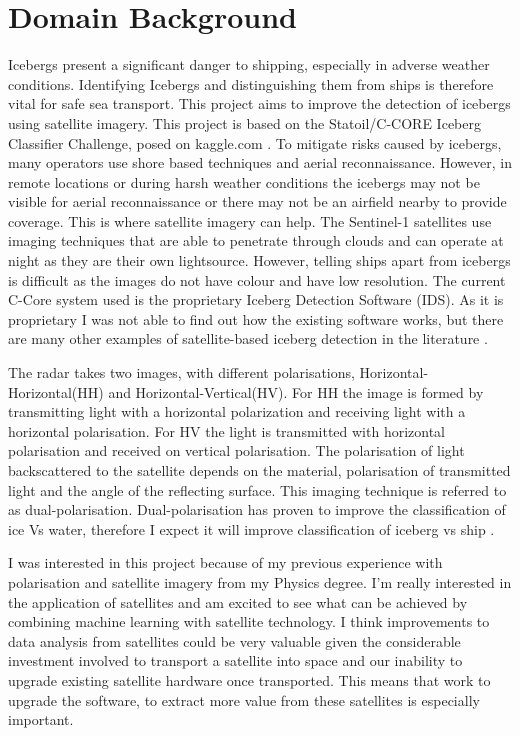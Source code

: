 \documentclass{article}
\begin{document}
\section{Domain Background}
Icebergs present a significant danger to shipping, especially in adverse weather conditions. Identifying Icebergs and distinguishing them from ships is therefore vital for safe sea transport. This project aims to improve the detection of icebergs using satellite imagery. This project is based on the Statoil/C-CORE Iceberg Classifier Challenge, posed on kaggle.com \cite{kaggle}. To mitigate risks caused by icebergs, many operators use shore based techniques and aerial reconnaissance. However, in remote locations or during harsh weather conditions the icebergs may not be visible for aerial reconnaissance or there may not be an airfield nearby to provide coverage. This is where satellite imagery can help. The Sentinel-1 satellites use imaging techniques that are able to penetrate through clouds and can operate at night as they are their own lightsource. However, telling ships apart from icebergs is difficult as the images do not have colour and have low resolution. The current C-Core system used is the proprietary Iceberg Detection Software (IDS). As it is proprietary I was not able to find out how the existing software works, but there are many other examples of satellite-based iceberg detection in the literature  \cite{c-core,bentes}. 

The radar takes two images, with different polarisations,  Horizontal-Horizontal(HH) and Horizontal-Vertical(HV). For HH the image is formed by transmitting light with a horizontal polarization and receiving light with a horizontal polarisation. For HV the light is transmitted with horizontal polarisation and received on vertical polarisation. The polarisation of light backscattered to the satellite depends on the material, polarisation of transmitted light and the angle of the reflecting surface. This imaging technique is referred to as dual-polarisation. Dual-polarisation has proven to improve the classification of ice Vs water, therefore I expect it will improve classification of iceberg vs ship \cite{radarsat-mode-selection,yu}. 

I was interested in this project because of my previous experience with polarisation and satellite imagery from my Physics degree. I'm really interested in the application of satellites and am excited to see what can be achieved by combining machine learning with satellite technology. I think improvements to data analysis from satellites could be very valuable given the considerable investment involved to transport a satellite into space and our inability to upgrade existing satellite hardware once transported. This means that work to upgrade the software, to extract more value from these satellites is especially important.  
\end{document}
